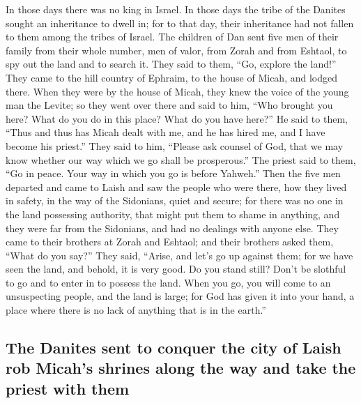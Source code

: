  In those days there was no king in Israel. In those days
the tribe of the Danites sought an inheritance to dwell in; for to that
day, their inheritance had not fallen to them among the tribes of
Israel.  The children of Dan sent five men of their family
from their whole number, men of valor, from Zorah and from Eshtaol, to
spy out the land and to search it. They said to them, ``Go, explore the
land!'' They came to the hill country of Ephraim, to the house of Micah,
and lodged there.  When they were by the house of Micah,
they knew the voice of the young man the Levite; so they went over there
and said to him, ``Who brought you here? What do you do in this place?
What do you have here?''  He said to them, ``Thus and thus
has Micah dealt with me, and he has hired me, and I have become his
priest.''  They said to him, ``Please ask counsel of God,
that we may know whether our way which we go shall be prosperous.''
 The priest said to them, ``Go in peace. Your way in which
you go is before Yahweh.''  Then the five men departed and
came to Laish and saw the people who were there, how they lived in
safety, in the way of the Sidonians, quiet and secure; for there was no
one in the land possessing authority, that might put them to shame in
anything, and they were far from the Sidonians, and had no dealings with
anyone else.  They came to their brothers at Zorah and
Eshtaol; and their brothers asked them, ``What do you say?''
 They said, ``Arise, and let's go up against them; for we
have seen the land, and behold, it is very good. Do you stand still?
Don't be slothful to go and to enter in to possess the land.
 When you go, you will come to an unsuspecting people,
and the land is large; for God has given it into your hand, a place
where there is no lack of anything that is in the earth.''

\hypertarget{the-danites-sent-to-conquer-the-city-of-laish-rob-micahs-shrines-along-the-way-and-take-the-priest-with-them}{%
\subsection{The Danites sent to conquer the city of Laish rob Micah's
shrines along the way and take the priest with
them}\label{the-danites-sent-to-conquer-the-city-of-laish-rob-micahs-shrines-along-the-way-and-take-the-priest-with-them}}

